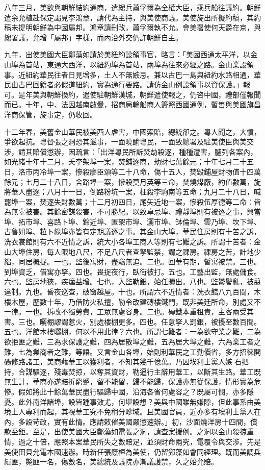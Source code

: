 \begin{pinyinscope}
八年三月，美欲與朝鮮結約通商，遣總兵蕭孚爾為全權大臣，乘兵船往議約。朝鮮遣余允植赴保定謁見李鴻章，請代為主持，與美使商議。美使旋出所擬約稿，其約稿未提明朝鮮為中國屬邦。鴻章請刪改，蕭孚爾執不允。會美署使何天爵在京，與總署議，允增「屬邦」字樣，而內治外交仍許朝鮮自主。

九年，出使美國大臣鄭藻如請於美紐約設領事官，略言：「美國西通太平洋，以金山埠為首站，東通大西洋，以紐約埠為首站，兩埠為往來必經之路。金山業設領事。近紐約華民往者日見增多，土人不無嫉忌。兼以古巴一島與紐約水路相通，華民由古巴回籍者必假道紐約，實為通行要路。請仿金山例設領事以資保護。」報可。是年美與朝鮮換約，遣使駐朝鮮漢城，朝鮮遣使報之，仍咨中國，禮部僅報聞而已。十年，中、法因越南啟釁，招商局輪船商人籌照西國通例，暫售與美國旗昌洋商保管，旋事定，仍收回。

十二年春，美舊金山華民被美西人虐害，中國索賠，總統卻之。粵人聞之，大憤，爭欲起抗。粵督張之洞恐其滋事，一面曉諭粵民，一面致總署及駐美使臣與美交涉，請其賠償懲辦，因疏言：「出洋粵民所訴焚劫殺逐，種種遭害，臚列各案內，如光緒十年十二月，夭李架埠一案，焚鋪逐商，劫財七萬餘元；十年七月二十五日，洛巿丙冷埠一案，慘殺廖臣頌等二十八命，傷十五人，焚毀鋪屋財物值十四萬餘元；七月二十八日，舍路埠一案，慘殺莫月英等三命，焚燒煤廠，約值數萬，旋將華人盡逐；八月十一日，倒路粉坑一案，枉殺李駒南等五命；九月二十八日，喊罷埠一案，焚逐失財數萬；十二月初四日，尾矢近地一案，慘殺伍厚德等二命：皆為無辜被害。其餘密謀殺害，不可勝紀。以致卓忌埠、禮靜埠則有被逐之事，興當埠、拓市埠、喜路卜埠、鈴近埠、匿架巿埠、灑巿埠、缽倫埠、雲乃埠、坎下埠、古魯姐埠、粒卜綠埠亦皆有定期議逐之事。其金山大埠，華民住房則有十苦之訴，洗衣裳館則有六不近情之訴，統大小各埠工商人等則有七難之訴。所謂十苦者：金山大埠住房，每人限地八尺，不足八尺者查拏監禁，謂之祼房。祼房之苦，計地少絀，同居概捉。一也。監後寓財，盡竊無追。二也。回華有期，暫寓被禁。三也。到埠資乏，借寓亦拏。四也。畏捉夜行，臥街被打。五也。工藝出監，無處傭食。六也。監房地狹，疾癘益增。七也，入監勒銀，始任贖出。八也。監鬱鬢亂，被翦違制。九也。昏夜巡查，破窗越屋。十也。所謂六不近情者：洗衣館八九百間，木樓木屋，歷數十年，乃借防火私擅，勒令改建磚樓鐵門，既非美廷所命，別處又不一律。一也。拆改不獨勞費，工眾無處容身。二也。磚鐵本重租貴，主客兩受其害。三也。曬棚謬謂惹火，別處樓棚更多。四也。任意拏人罰銀，被擾至數百間。五也。洋館木樓曬棚，何以不用此律？六也。所謂七難者：一為欲守業之難，二為欲拒匪之難，三為求保護之難，四為居散埠之難，五為居大埠之難，六為業工者之難，七為業商者之難，等語。又言金山各埠，始則利華民之工勤價省，多方招徠開礦修路諸工，美商藉華工以獲利者，不知其幾千億萬。乃因埃利士黨人嫉石把持，合謀驅逐，殘毒焚掠，以奪其資財，勒逼行主辭用華工，以斷其生路。華工既無生計，華商亦遂賠折窮蹙，留不能留，歸不能歸，保護亦無從保護，情形實為危慘。假如將此十餘萬華民盡行驅歸中國，沿海各省何處容之？既屬可憫，亦多隱憂。此外南洋諸埠，設皆踵事效尤，何堪設想？美與中國雖無嫌隙，但此事系由美境土人專利而起，其視華工究不免稍分畛域。且美國官員，近亦多有埃利士黨人在內，多設苛政，實有此情。應請敕催美國嚴懲速辦。」初，沙面燒洋房十四間，償款至鉅。至是，出使美國大臣鄭藻如電張之洞，請查案援例。之洞以金山殺掠重情，過之十倍，應照本案華民所失之數賠足，並須財命兩究，電覆令與交涉。先是美使田貝允電本國速辦。時新任張廕桓為美使，仍留鄭藻如會同經理。既而美調兵緝匪，斃匪一名，傷數名，美總統及議院亦漸議護禁，久之始允賠。


\end{pinyinscope}
